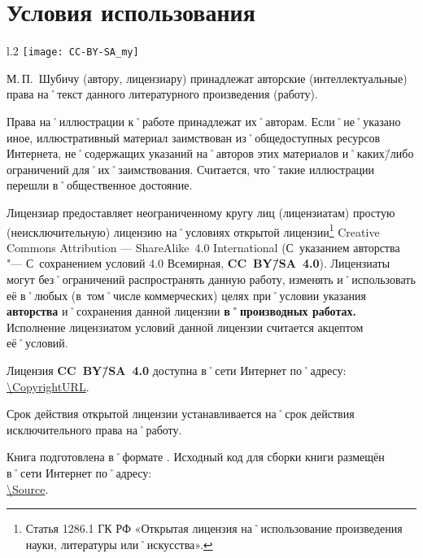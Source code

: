 ﻿%
\chapter{Условия использования}

\begin{wrapfigure}{l}{.2\textwidth}
\centering
\texttt{[image: CC-BY-SA\_my]}
\label{fig:CC-BY-SA}
\end{wrapfigure}

\noindent М.\,П.~Шубичу (автору, лицензиару) принадлежат авторские (интеллектуальные) права на˚текст данного литературного произведения (работу). 

\noindent Права на˚иллюстрации к˚работе принадлежат их˚авторам. Если˚не˚указано иное, иллюстративный материал заимствован из˚общедоступных ресурсов Интернета, не˚содержащих указаний на˚авторов этих материалов и˚каких\=/либо ограничений для˚их˚заимствования. Считается, что˚такие иллюстрации перешли в˚общественное достояние.

Лицензиар предоставляет неограниченному кругу лиц (лицензиатам) простую (неисключительную) лицензию на˚условиях открытой лицензии\footnote
{Статья 1286.1 ГК РФ «Открытая лицензия на˚использование произведения науки, литературы или˚искусства».}
\foreignlanguage{english}{Creative Commons Attribution --- ShareAlike~4.0 International} (С~указанием авторства "--- С~сохранением условий 4.0 Всемирная, \textbf{CC~BY\=/SA~4.0}). Лицензиаты могут без˚ограничений распространять данную работу, изменять и˚использовать её в˚любых (в~том˚числе коммерческих) целях при˚условии указания \textbf{авторства} и˚сохранения данной лицензии \textbf{в˚производных работах.}
Исполнение лицензиатом условий данной лицензии считается акцептом её˚условий.

Лицензия \textbf{CC~BY\=/SA~4.0} доступна в˚сети Интернет по˚адресу: \url{\CopyrightURL}. 

Срок действия открытой лицензии устанавливается на˚срок действия исключительного права на˚работу.

\enlargethispage{-\baselineskip}	%
\pagebreak												%
Книга подготовлена в˚формате \LaTeXe{}. Исходный код для сборки книги размещён в˚сети Интернет по˚адресу:\\[1ex] {\small\url{\Source}}.{\sloppy

}%
